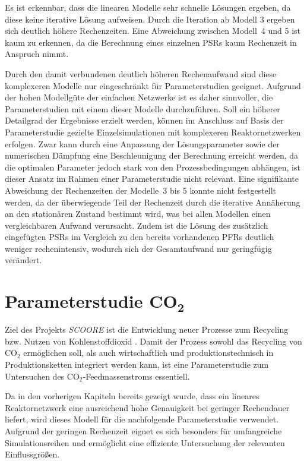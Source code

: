         Es ist erkennbar, dass die linearen Modelle sehr schnelle Lösungen ergeben, da diese keine iterative Lösung aufweisen. Durch die Iteration ab Modell 3 ergeben sich deutlich höhere Rechenzeiten. Eine Abweichung zwischen Modell~4 und 5 ist kaum zu erkennen, da die Berechnung eines einzelnen PSRs kaum Rechenzeit in Anspruch nimmt. 
        
        Durch den damit verbundenen deutlich höheren Rechenaufwand sind diese kom\-plexeren Modelle nur eingeschränkt für Parameterstudien geeignet. Aufgrund der hohen Modellgüte der einfachen Netzwerke ist es daher sinnvoller, die Parameterstudien mit einem dieser Modelle durchzuführen. Soll ein höherer Detailgrad der Ergebnisse erzielt werden, können im Anschluss auf Basis der Parameterstudie gezielte Einzelsimulationen mit komplexeren Reaktornetzwerken erfolgen. Zwar kann durch eine Anpassung der Lösungsparameter sowie der numerischen Dämpfung eine Beschleunigung der Berechnung erreicht werden, da die optimalen Parameter jedoch stark von den Prozessbedingungen abhängen, ist dieser Ansatz im Rahmen einer Parameterstudie nicht relevant. Eine signifikante Abweichung der Rechenzeiten der Modelle~3 bis 5 konnte nicht festgestellt werden, da der überwiegende Teil der Rechenzeit durch die iterative Annäherung an den stationären Zustand bestimmt wird, was bei allen Modellen einen vergleichbaren Aufwand verursacht. Zudem ist die Lösung des zusätzlich eingefügten PSRs im Vergleich zu den bereits vorhandenen PFRs deutlich weniger rechenintensiv, wodurch sich der Gesamtaufwand nur geringfügig verändert.
    \section{Parameterstudie CO$_\mathbf 2$}
        Ziel des Projekts \textit{SCOORE} ist die Entwicklung neuer Prozesse zum Recycling bzw. Nutzen von Kohlenstoffdioxid \cite{Scoore_Enargus}. Damit der Prozess sowohl das Recycling von CO$_2$ ermöglichen soll, als auch wirtschaftlich und produktionstechnisch in Produktionsketten integriert werden kann, ist eine Parameterstudie zum Untersuchen des CO$_2$-Feedmassen\-stroms essentiell.

        Da in den vorherigen Kapiteln bereits gezeigt wurde, dass ein lineares Reaktornetzwerk eine ausreichend hohe Genauigkeit bei geringer Rechendauer liefert, wird dieses Modell für die nachfolgende Parameterstudie verwendet. Aufgrund der geringen Rechenzeit eignet es sich besonders für umfangreiche Simulationsreihen und ermöglicht eine effiziente Untersuchung der relevanten Einflussgrößen.
        
